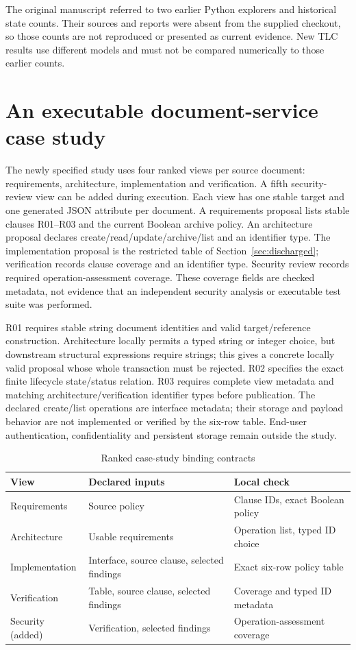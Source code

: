 \documentclass[pdflatex,sn-mathphys-num]{sn-jnl}
\theoremstyle{thmstyleone}
\theoremstyle{thmstylethree}
\theoremstyle{thmstyletwo}
\begin{document}
The original manuscript referred to two earlier Python explorers and historical state counts. Their sources and reports were absent from the supplied checkout, so those counts are not reproduced or presented as current evidence. New TLC results use different models and must not be compared numerically to those earlier counts.

\section{An executable document-service case study}\label{sec:case-study}
The newly specified study uses four ranked views per source document: requirements, architecture, implementation and verification. A fifth security-review view can be added during execution. Each view has one stable target and one generated JSON attribute per document. A requirements proposal lists stable clauses R01--R03 and the current Boolean archive policy. An architecture proposal declares create/read/update/archive/list and an identifier type. The implementation proposal is the restricted table of Section~\ref{sec:discharged}; verification records clause coverage and an identifier type. Security review records required operation-assessment coverage. These coverage fields are checked metadata, not evidence that an independent security analysis or executable test suite was performed.

R01 requires stable string document identities and valid target/reference construction. Architecture locally permits a typed string or integer choice, but downstream structural expressions require strings; this gives a concrete locally valid proposal whose whole transaction must be rejected. R02 specifies the exact finite lifecycle state/status relation. R03 requires complete view metadata and matching architecture/verification identifier types before publication. The declared create/list operations are interface metadata; their storage and payload behavior are not implemented or verified by the six-row table. End-user authentication, confidentiality and persistent storage remain outside the study.

\begin{table}[tb]
\caption{Ranked case-study binding contracts}\label{tab:bindings}
\small\begin{tabularx}{\linewidth}{@{}lXX@{}}\toprule
View & Declared inputs & Local check\\\midrule
Requirements & Source policy & Clause IDs, exact Boolean policy\\
Architecture & Usable requirements & Operation list, typed ID choice\\
Implementation & Interface, source clause, selected findings & Exact six-row policy table\\
Verification & Table, source clause, selected findings & Coverage and typed ID metadata\\
Security (added) & Verification, selected findings & Operation-assessment coverage\\\bottomrule
\end{tabularx}
\end{table}
\end{document}

